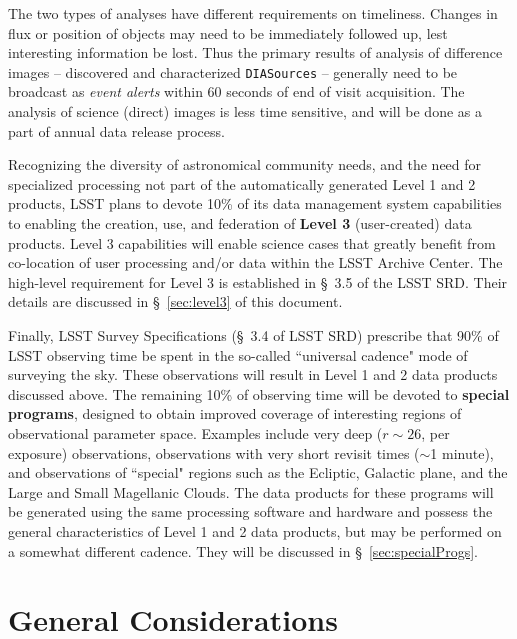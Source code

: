 \documentclass[12pt]{article}
\newcommand{\code}[1]{\texttt{#1}}
\newcommand{\DIASources}{\code{DIASources}\xspace}
\begin{document}
The two types of analyses have different requirements on timeliness. Changes in flux or position of objects may need to be immediately followed up, lest interesting information be lost. Thus the primary results of analysis of difference images -- discovered and characterized \DIASources{} -- generally need to be broadcast as {\em event alerts} within 60 seconds of end of visit acquisition. The analysis of science (direct) images is less time sensitive, and will be done as a part of annual data release process.

\vspace{1em}

Recognizing the diversity of astronomical community needs, and the need for specialized processing not part of the automatically generated Level 1 and 2 products, LSST plans to devote 10\% of its data management system capabilities to enabling the creation, use, and federation of {\bf Level 3} (user-created) data products. Level 3 capabilities will enable science cases that greatly benefit from co-location of user processing and/or data within the LSST Archive Center. The high-level requirement for Level 3 is established in \S~3.5 of the LSST SRD. Their details are discussed in \S~\ref{sec:level3} of this document.

\vspace{1em}

Finally, LSST Survey Specifications (\S~3.4 of LSST SRD) prescribe that 90\% of LSST observing time be spent in the so-called ``universal cadence" mode of surveying the sky. These observations will result in Level 1 and 2 data products discussed above. The remaining 10\% of observing time will be devoted to {\bf special programs}, designed to obtain improved coverage of interesting regions of observational parameter space. Examples include very deep ($r \sim 26$, per exposure) observations, observations with very short revisit times ($\sim$1 minute), and observations of ``special" regions such as the Ecliptic, Galactic plane, and the Large and Small Magellanic Clouds. The data products for these programs will be generated using the same processing software and hardware and possess the general characteristics of Level 1 and 2 data products, but may be performed on a somewhat different cadence. They will be discussed in \S~\ref{sec:specialProgs}.


\section{General Considerations}
\end{document}
